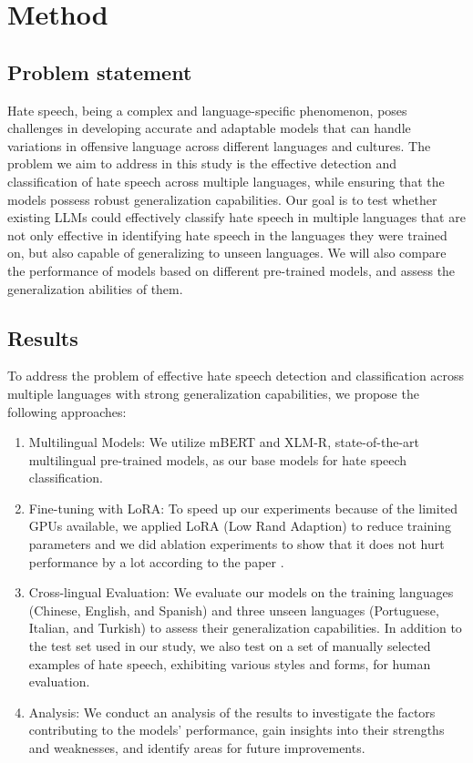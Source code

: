 \documentclass[11pt]{article}
\begin{document}
\section{Method}

\subsection{Problem statement}
Hate speech, being a complex and language-specific phenomenon, poses challenges in developing accurate and adaptable models that can handle variations in offensive language across different languages and cultures. The problem we aim to address in this study is the effective detection and classification of hate speech across multiple languages, while ensuring that the models possess robust generalization capabilities.  Our goal is to test whether existing LLMs could effectively classify hate speech in multiple languages that are not only effective in identifying hate speech in the languages they were trained on, but also capable of generalizing to unseen languages. We will also compare the performance of models based on different pre-trained models, and assess the generalization abilities of them.

\subsection{Results}
To address the problem of effective hate speech detection and classification across multiple languages with strong generalization capabilities, we propose the following approaches:
\begin{enumerate}
    \item Multilingual Models: We utilize mBERT and XLM-R, state-of-the-art multilingual pre-trained models, as our base models for hate speech classification.
    \item Fine-tuning with LoRA: To speed up our experiments because of the limited GPUs available, we applied LoRA (Low Rand Adaption) to reduce training parameters and we did ablation experiments to show that it does not hurt performance by a lot according to the paper \cite{hu2021lora}.
    \item Cross-lingual Evaluation: We evaluate our models on the training languages (Chinese, English, and Spanish) and three unseen languages (Portuguese, Italian, and Turkish) to assess their generalization capabilities. In addition to the test set used in our study, we also test on a set of manually selected examples of hate speech, exhibiting various styles and forms, for human evaluation.
    \item Analysis: We conduct an analysis of the results to investigate the factors contributing to the models' performance, gain insights into their strengths and weaknesses, and identify areas for future improvements.
\end{enumerate}
\end{document}
